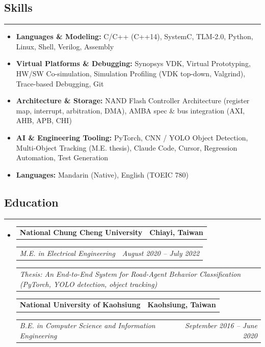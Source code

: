 \documentclass[11pt,a4paper]{article}
\makeatletter
\newcommand{\headerrow}[2]
{\begin{tabular*}{\linewidth}{l@{\extracolsep{\fill}}r}
#1 &
#2 \\
\end{tabular*}}
\makeatother
\begin{document}
\subsection*{\large Skills}
\hrule
\vspace{0.3em}

\begin{itemize}[leftmargin=1em,noitemsep]
	\item \textbf{Languages \& Modeling:}
	      C/C++ (C++14), SystemC, TLM-2.0, Python, Linux, Shell, Verilog, Assembly
	\item \textbf{Virtual Platforms \& Debugging:}
	      Synopsys VDK, Virtual Prototyping, HW/SW Co-simulation, Simulation Profiling (VDK top-down, Valgrind), Trace-based Debugging, Git
	\item \textbf{Architecture \& Storage:}
	      NAND Flash Controller Architecture (register map, interrupt, arbitration, DMA), AMBA spec \& bus integration (AXI, AHB, APB, CHI)
	\item \textbf{AI \& Engineering Tooling:}
	      PyTorch, CNN / YOLO Object Detection, Multi-Object Tracking (M.E. thesis), Claude Code, Cursor, Regression Automation, Test Generation
    \item \textbf{Languages:}
          Mandarin (Native), English (TOEIC 780)
\end{itemize}

\subsection*{\large Education}
\hrule
\vspace{0.3em}

\begin{itemize}[leftmargin=1em]
	\parskip=0.1em
		
	\item
	      \headerrow
	      {\textbf{National Chung Cheng University}}
	      {\textbf{Chiayi, Taiwan}}
	      \headerrow
	      {\emph{M.E. in Electrical Engineering}}
	      {\emph{August 2020 -- July 2022}}
          \headerrow
          {\emph{Thesis: An End-to-End System for Road-Agent Behavior Classification (PyTorch, YOLO detection, object tracking)}}
          {\emph{}}
          
	      \headerrow
          {\textbf{National University of Kaohsiung}}
	      {\textbf{Kaohsiung, Taiwan}}
          \headerrow
	      {\emph{B.E. in Computer Science and Information Engineering}}
	      {\emph{September 2016 -- June 2020}}
\end{itemize}
\end{document}
